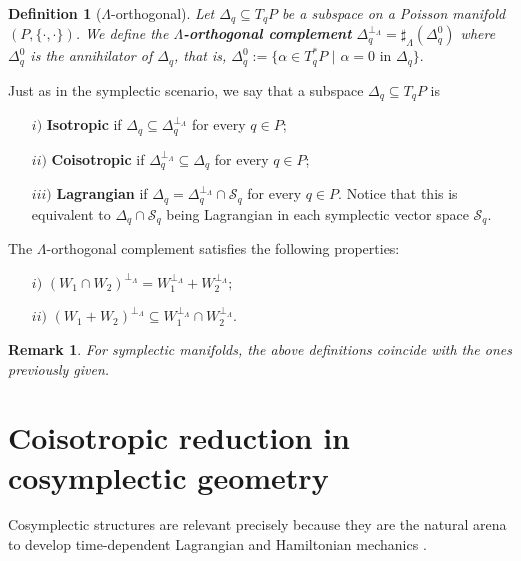 \documentclass[12pt]{article}
\newtheorem{Def}{Definition}[section]
\newtheorem{remark}{Remark}[section]
\newcommand{\sectiontitle}{section}
\newcommand{\setsectiontitle}[1]{\renewcommand{\sectiontitle}{\footnotesize\textit{#1}}}
\begin{document}
\begin{Def}[$\Lambda$-orthogonal] Let $\Delta_q \subseteq T_qP$ be a subspace on a Poisson manifold $(P, \{\cdot, \cdot \})$. We define the \textbf{$\Lambda$-orthogonal complement} $\Delta_q^{\perp_\Lambda}= \sharp_\Lambda(\Delta_q^0)$ where $\Delta_q^0$ is the annihilator of $\Delta_q$, that is, $\Delta_q^0:= \{\alpha \in T^*_qP \,\, | \, \, \alpha = 0 \,\, \text{in} \,\, \Delta_q\}.$
\end{Def}

Just as in the symplectic scenario, we say that a subspace $\Delta_q\subseteq T_qP$ is
\begin{itemize}
\item[$i)$] \textbf{Isotropic} if $\Delta_q \subseteq \Delta_q^{\perp_\Lambda}$ for every $q \in P$;
\item[$ii)$] \textbf{Coisotropic} if $\Delta_q^{\perp_\Lambda} \subseteq \Delta_q$ for every $q \in P$;
\item[$iii)$] \textbf{Lagrangian} if $\Delta_q =  \Delta_q^{\perp_\Lambda} \cap \mathcal{S}_q$ for every $q \in P$. Notice that this is equivalent to $\Delta_q \cap \mathcal{S}_q$ being Lagrangian in each symplectic vector space $\mathcal{S}_q.$
\end{itemize}

The $\Lambda$-orthogonal complement satisfies the following properties:

\begin{itemize}
\item[$i)$] $(W_1 \cap W_2)^{\perp_\Lambda} = W_1^{\perp_\Lambda} + W_2^{\perp_\Lambda};$
\item[$ii)$] $(W_1 + W_2)^{\perp_\Lambda} \subseteq  W_1^{\perp_\Lambda} \cap W_2^{\perp_\Lambda}.$\\
\end{itemize}

\begin{remark}{\rm
    For symplectic manifolds, the above definitions coincide with the ones previously given.}
\end{remark}


\section{Coisotropic reduction in cosymplectic geometry}\label{Cosymplectic}
\setsectiontitle{COISOTROPIC REDUCTION IN COSYMPLECTIC GEOMETRY}

Cosymplectic structures are relevant precisely because they are the natural arena to develop time-dependent Lagrangian and Hamiltonian mechanics \cites{de2011methods}.\\ 
\end{document}

